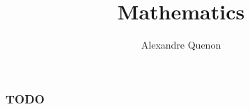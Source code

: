 \documentclass[11pt]{beamer}
\title{Mathematics}
\author[A. Quenon]{Alexandre Quenon}
\begin{document}
\begin{frame}
	\titlepage
\end{frame}


\begin{frame}
	\frametitle{TODO}

	
\end{frame}


  
\end{document}
